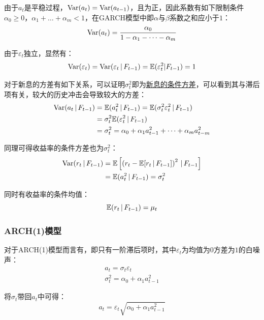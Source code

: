 \documentclass[11pt]{article}
\begin{document}
由于$a_t$是平稳过程，$\operatorname{Var}(a_{t}) = \operatorname{Var}(a_{t-1})$，且为正，因此系数有如下限制条件$\alpha_0 \geq 0$，$\alpha_1+\dots+\alpha_m<1$，在GARCH模型中即$\alpha$与$\beta$系数之和应小于$1$：
\begin{equation*}
    \operatorname{Var}(a_t) = \frac{\alpha_0}{1-\alpha_1 - \dots - \alpha_m}
\end{equation*}

由于$\varepsilon_t$独立，显然有：
\begin{equation*}
    \operatorname{Var}(\varepsilon_t) = \operatorname{Var}(\varepsilon_t \,\vert\, F_{t-1}) = \mathbb{E}(\varepsilon_{t}^{2} | F_{t-1}) = 1
\end{equation*}

对于新息的方差有如下关系，可以证明$\sigma_{t}^{2}$即为\uline{新息的条件方差}，可以看到其与滞后项有关，较大的历史冲击会导致较大的方差：
\begin{align*}
    \operatorname{Var}(a_t \,\vert\, F_{t-1})
    &= \mathbb{E}(a_{t}^{2} \,\vert\, F_{t-1})
    = \mathbb{E}(\sigma_{t}^{2} \varepsilon_{t}^{2} \,\vert\, F_{t-1}) \\
    &= \sigma_{t}^{2} \mathbb{E}(\varepsilon_{t}^{2} \,\vert\, F_{t-1}) \\
    &= \sigma_{t}^{2} = \alpha_0 + \alpha_1 a_{t-1}^2 + \dots + \alpha_m a_{t-m}^2
\end{align*}

同理可得收益率的条件方差也为$\sigma_{t}^{2}$：
\begin{align*}
    \operatorname{Var}(r_t \,\vert\, F_{t-1}) &= \mathbb{E}\left[ \left( r_t - \mathbb{E}[r_t \,\vert\, F_{t-1}] \right)^2 \,\vert\, F_{t-1} \right] \\
    &= \mathbb{E}(a_{t}^{2} \,\vert\, F_{t-1}) = \sigma_{t}^{2}
\end{align*}

同时有收益率的条件均值：
\begin{equation*}
    \mathbb{E}(r_t \,\vert\, F_{t-1}) = \mu_t
\end{equation*}

\subsubsection{ARCH(1)模型}

对于ARCH(1)模型而言有，即只有一阶滞后项时，其中$\varepsilon_t$为均值为$0$方差为$1$的白噪声：
\begin{gather*}
    a_t = \sigma_t \varepsilon_t \\
    \sigma_{t}^{2} = \alpha_0 + \alpha_1 a_{t-1}^{2}
\end{gather*}

将$\sigma_t$带回$a_t$中可得：
\begin{equation*}
    a_t = \varepsilon_t \sqrt{\alpha_0 + \alpha_1 a_{t-1}^{2}}
\end{equation*}
\end{document}
